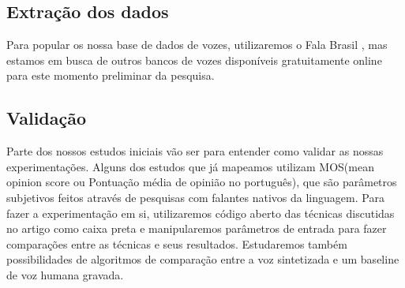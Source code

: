 \documentclass[a4paper,12pt]{article}
\begin{document}
		\subsection{Extração dos dados}
		Para popular os nossa base de dados de vozes, utilizaremos o Fala Brasil \cite{falabrasil}, mas estamos em busca de outros bancos de vozes disponíveis gratuitamente online para este momento preliminar da pesquisa.

		\subsection{Validação}
		Parte dos nossos estudos iniciais vão ser para entender como validar as nossas experimentações. Alguns dos estudos que já mapeamos utilizam MOS(mean opinion score ou Pontuação média de opinião no português), que são parâmetros subjetivos feitos através de pesquisas com falantes nativos da linguagem. Para fazer a experimentação em si, utilizaremos código aberto das técnicas discutidas no artigo como caixa preta e manipularemos parâmetros de entrada para fazer comparações entre as técnicas e seus resultados. Estudaremos também possibilidades de algoritmos de comparação entre a voz sintetizada e um baseline de voz humana gravada.
	
	
	
\end{document}
